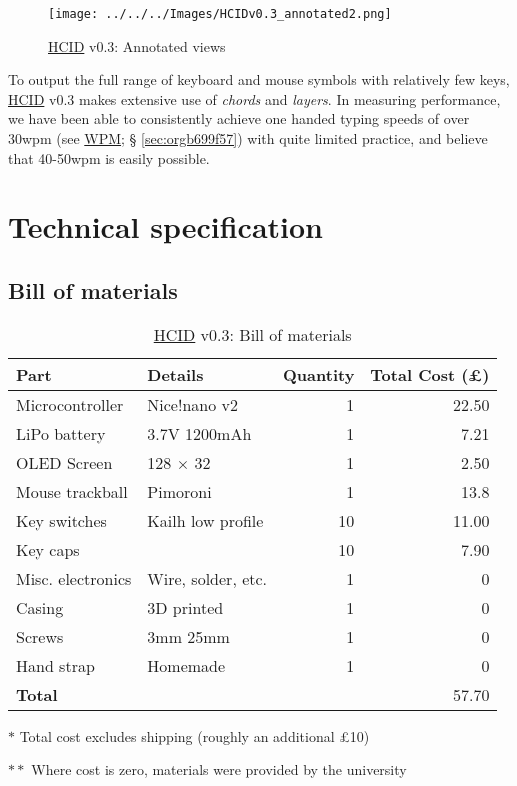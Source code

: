 \documentclass[logo,bsc,singlespacing,parskip]{infthesis}
\begin{document}
\begin{figure}[h]
\centering
\texttt{[image: ../../../Images/HCIDv0.3\_annotated2.png]}
\caption{\hyperref[org30e2275]{HCID} v0.3: Annotated views}
\end{figure}

To output the full range of keyboard and mouse symbols with relatively few keys, \hyperref[org30e2275]{HCID} v0.3 makes extensive use of \emph{chords} and \emph{layers}. In measuring performance, we have been able to consistently achieve one handed typing speeds of over 30wpm (see \hyperref[sec:orgb699f57]{WPM}; § \ref{sec:orgb699f57}) with quite limited practice, and believe that 40-50wpm is easily possible.
\section{Technical specification}
\label{sec:orgfae8c73}
\subsection{Bill of materials}
\label{sec:orga4c86c4}
\begin{table}
\begin{threeparttable}
\begin{tabular}{llrr}
\toprule
\textbf{Part} & \textbf{Details} & \textbf{Quantity} & \textbf{Total Cost (£)}\\
\midrule
Microcontroller & Nice!nano v2 \autocite{NiceNanoNice} & 1 & 22.50\\
LiPo battery & 3.7V 1200mAh \autocite{adafruitLiPo} & 1 & 7.21\\
OLED Screen & 128 \(\times\) 32 \autocite{128X32OLEDScreen} & 1 & 2.50\\
Mouse trackball & Pimoroni \autocite{TrackballBreakoutPimoroni} & 1 & 13.8\\
Key switches & Kailh low profile \autocite{Mechboards} & 10 & 11.00\\
Key caps & \autocite{Mechboards} & 10 & 7.90\\
Misc. electronics & Wire, solder, etc. & 1 & 0\\
Casing & 3D printed & 1 & 0\\
Screws & 3mm \texttimes{} 25mm & 1 & 0\\
Hand strap & Homemade & 1 & 0\\
\midrule
\textbf{Total} &  &  & 57.70\\
\bottomrule
\end{tabular}
\begin{tablenotes}
\item[] \(\ast\) Total cost excludes shipping (roughly an additional £10)
\item[] \(\ast \ast\) Where cost is zero, materials were provided by the university
\end{tablenotes}
\caption{\label{tab:bom}\hyperref[org30e2275]{HCID} v0.3: Bill of materials}
\end{threeparttable}
\end{table}
\end{document}
